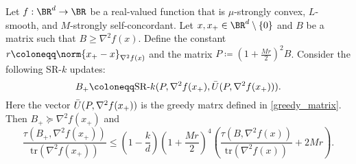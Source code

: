 \begin{lemma}
    Let $f: \BR^d \to \BR$ be a real-valued function that is $\mu$-strongly convex, $L$-smooth, and $M$-strongly self-concordant. Let $x, x_{+} \in \BR^d \setminus \{0\}$ and $B$ be a matrix such that $B \geq \nabla^2 f(x)$. Define the constant $r \coloneqq \norm{x_{+} - x}_{\nabla^2 f(x)}$ and the matrix $P \coloneqq \left(1 + \frac{M r}{2}\right)^2 B$. Consider the following SR-$k$ updates:
    \begin{equation*}
        B_{+} \coloneqq \mathrm{SR}\textrm{-}k(P, \nabla^2 f(x_{+}), \Bar{U}(P, \nabla^2 f(x_{+}))).
    \end{equation*}
    Here the vector $\Bar{U}(P, \nabla^2 f(x_{+}))$ is the greedy matrx defined in \eqref{greedy_matrix}. Then $B_{+} \succeq \nabla^2 f(x_{+})$ and
    \begin{equation*}
        \frac{\tau(B_{+}, \nabla^2 f(x_{+}))}{\mathrm{tr}(\nabla^2 f(x_{+}))} \leq \left(1 - \frac{k}{d}\right)\left(1 + \frac{Mr}{2}\right)^4 \left(\frac{\tau (B, \nabla^2 f(x))}{\mathrm{tr}(\nabla^2 f(x))} + 2 M r  \right).
    \end{equation*}
    \label{lemma:one_step_approx_srk}
\end{lemma}
